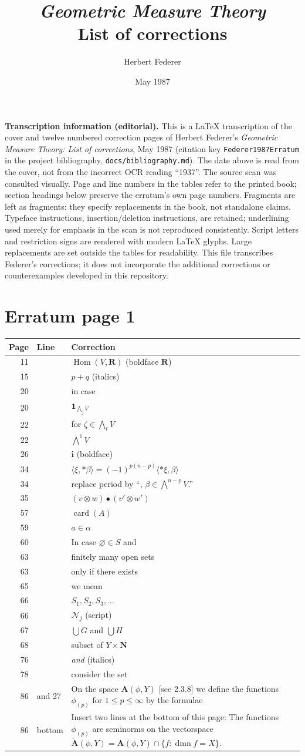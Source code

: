 \documentclass[11pt]{article}
\title{\textit{Geometric Measure Theory}\\List of corrections}
\author{Herbert Federer}
\date{May 1987}
\makeatletter
\newcommand{\R}{\mathbf R}
\newcommand{\N}{\mathbf N}
\newcommand{\dmn}{\operatorname{dmn}}
\newcommand{\entry}[3]{#1&#2&#3\\[4pt]}
\newenvironment{corrections}{%
  \begin{longtable}{@{}r >{\raggedright\arraybackslash}p{21mm} >{\raggedright\arraybackslash}p{118mm}@{}}
  \textbf{Page}&\textbf{Line}&\textbf{Correction}\\\hline\endhead
}{\end{longtable}}
\makeatother
\begin{document}
\maketitle
\noindent\textbf{Transcription information (editorial).}
This is a LaTeX transcription of the cover and twelve numbered correction
pages of Herbert Federer's \textit{Geometric Measure Theory: List of
corrections}, May 1987 (citation key \texttt{Federer1987Erratum} in the
project bibliography, \texttt{docs/bibliography.md}). The date above is read from the cover, not from the
incorrect OCR reading ``1937''. The source scan was consulted visually.
Page and line numbers in the tables refer to the printed book; section
headings below preserve the erratum's own page numbers. Fragments are left
as fragments: they specify replacements in the book, not standalone claims.
Typeface instructions, insertion/deletion instructions, are retained; underlining used merely for emphasis in the scan is not
reproduced consistently. Script letters and restriction signs are rendered with modern
LaTeX glyphs. Large replacements are set outside the tables for readability.
This file transcribes Federer's corrections; it does not incorporate the
additional corrections or counterexamples developed in this repository.

\section*{Erratum page 1}
\begin{corrections}
\entry{11}{8}{$\operatorname{Hom}(V,\R)$ (boldface $\R$)}
\entry{15}{17}{$p+q$ (italics)}
\entry{20}{11}{in case}
\entry{20}{32}{$\mathbf 1_{\bigwedge_j V}$}
\entry{22}{9}{for $\zeta\in\bigwedge_t V$}
\entry{22}{11}{$\bigwedge^1 V$}
\entry{26}{24}{$\mathbf i$ (boldface)}
\entry{34}{29}{$\langle\xi,*\beta\rangle=(-1)^{p(n-p)}\langle *\xi,\beta\rangle$}
\entry{34}{30}{replace period by ``, $\beta\in\bigwedge^{n-p}V$.''}
\entry{35}{3}{$(v\otimes w)\bullet(v'\otimes w')$}
\entry{57}{26}{$\operatorname{card}(A)$}
\entry{59}{3}{$a\in\alpha$}
\entry{60}{4}{In case $\varnothing\in S$ and}
\entry{63}{2}{finitely many open sets}
\entry{63}{30}{only if there exists}
\entry{65}{20}{we mean}
\entry{66}{13}{$S_1,S_2,S_3,\ldots$}
\entry{66}{15}{$\mathscr N_j$ (script)}
\entry{67}{2}{$\bigcup G$ and $\bigcup H$}
\entry{68}{14}{subset of $Y\times\N$}
\entry{76}{3}{\textit{and} (italics)}
\entry{78}{7}{consider the set}
\entry{86}{26 and 27}{On the space $\mathbf A(\phi,Y)$ [see 2.3.8] we define the functions $\phi_{(p)}$ for $1\le p\le\infty$ by the formulae}
\entry{86}{bottom}{Insert two lines at the bottom of this page:\newline
The functions $\phi_{(p)}$ are seminorms on the vectorspace
$\widetilde{\mathbf A}(\phi,Y)=\mathbf A(\phi,Y)\cap\{f:\dmn f=X\}$.}
\end{corrections}
\end{document}

